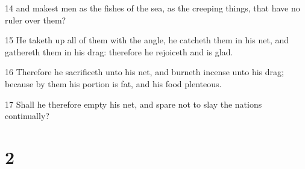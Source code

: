 \par 14 and makest men as the fishes of the sea, as the creeping things, that have no ruler over them?
\par 15 He taketh up all of them with the angle, he catcheth them in his net, and gathereth them in his drag: therefore he rejoiceth and is glad.
\par 16 Therefore he sacrificeth unto his net, and burneth incense unto his drag; because by them his portion is fat, and his food plenteous.
\par 17 Shall he therefore empty his net, and spare not to slay the nations continually?

\chapter{2}

